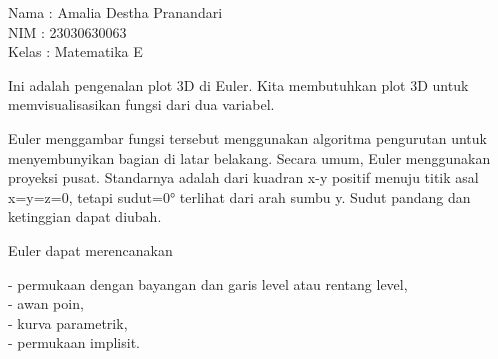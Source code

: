 \documentclass[a4paper,10pt]{article}
\begin{document}
\begin{eulernotebook}
\begin{eulercomment}
Nama  : Amalia Destha Pranandari\\
NIM   : 23030630063\\
Kelas : Matematika E

\begin{eulercomment}
\begin{eulercomment}
Ini adalah pengenalan plot 3D di Euler. Kita membutuhkan plot 3D untuk
memvisualisasikan fungsi dari dua variabel.

Euler menggambar fungsi tersebut menggunakan algoritma pengurutan
untuk menyembunyikan bagian di latar belakang. Secara umum, Euler
menggunakan proyeksi pusat. Standarnya adalah dari kuadran x-y positif
menuju titik asal x=y=z=0, tetapi sudut=0° terlihat dari arah sumbu y.
Sudut pandang dan ketinggian dapat diubah.

Euler dapat merencanakan

- permukaan dengan bayangan dan garis level atau rentang level,\\
- awan poin,\\
- kurva parametrik,\\
- permukaan implisit.


\end{eulercomment}
\end{eulercomment}
\end{eulercomment}
\end{eulernotebook}
\end{document}
